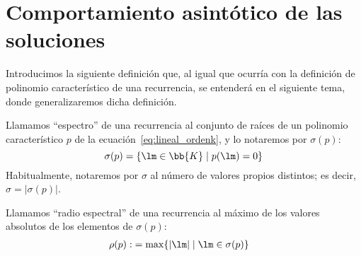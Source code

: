 \begin{comment}    
Como consecuencia, si los coeficientes $a_i$ de~\ref{eq:lineal_ordenk} son reales y existe algún \newline${\lm_t = \rho_t(\cos\theta_t + i\sen\theta_t) \in \bb{C}\setminus\bb{R}}$, entonces tenemos que $f_t(n)\cos(n\theta_t)\rho_t^n$ y\newline $f_t(n)\sen(n\theta_t)\rho_t^n$ son soluciones de la ecuación homogénea.
\end{comment}

\section{Comportamiento asintótico de las soluciones}
Introducimos la siguiente definición que, al igual que ocurría con la definición de polinomio característico de una recurrencia, se entenderá en el siguiente tema, donde generalizaremos dicha definición.
\begin{definicion}[Espectro]
    Llamamos ``espectro'' de una recurrencia al conjunto de raíces de un polinomio característico $p$ de la ecuación~\ref{eq:lineal_ordenk}, y lo notaremos por $\sigma(p)$:
    \begin{equation*}
        \sigma(p) = \{\lm \in \bb{K} \mid p(\lm) = 0\}
    \end{equation*}
    Habitualmente, notaremos por $\sigma$ al número de valores propios distintos; es decir, $\sigma=|\sigma(p)|$.
\end{definicion}
\begin{definicion}
    Llamamos ``radio espectral'' de una recurrencia
    al máximo de los valores absolutos de los elementos de $\sigma(p)$:
    \begin{align*}
        \rho(p) :&= \max\{|\lm|\mid \lm\in \sigma(p)\}
    \end{align*}
\end{definicion}

